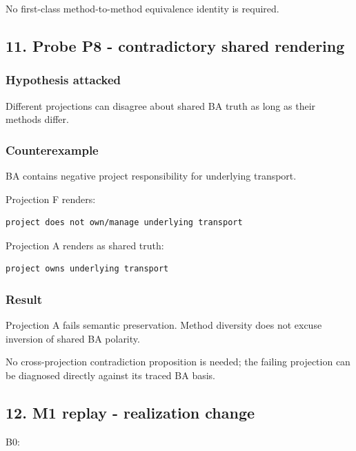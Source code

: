 \documentclass[11pt,a4paper]{article}
\begin{document}
No first-class method-to-method equivalence identity is required.

\subsection{11. Probe P8 - contradictory shared
rendering}\label{11-probe-p8---contradictory-shared-rendering}

\subsubsection{Hypothesis attacked}\label{hypothesis-attacked-7}

Different projections can disagree about shared BA truth as long as
their methods differ.

\subsubsection{Counterexample}\label{counterexample-2}

BA contains negative project responsibility for underlying transport.

Projection F renders:

\begin{verbatim}
project does not own/manage underlying transport
\end{verbatim}

Projection A renders as shared truth:

\begin{verbatim}
project owns underlying transport
\end{verbatim}

\subsubsection{Result}\label{result-7}

Projection A fails semantic preservation. Method diversity does not
excuse inversion of shared BA polarity.

No cross-projection contradiction proposition is needed; the failing
projection can be diagnosed directly against its traced BA basis.

\subsection{12. M1 replay - realization
change}\label{12-m1-replay---realization-change}

B0:
\end{document}
